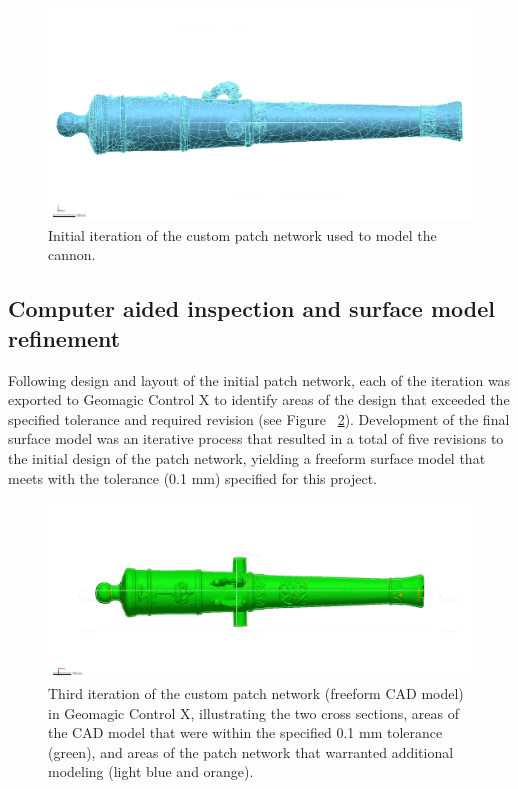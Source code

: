 \documentclass[review]{elsarticle}
\begin{document}
\begin{figure}[ht]\centering
\includegraphics[width=\linewidth]{FigLSC3}
\caption{Initial iteration of the custom patch network used to model the cannon.}
\label{fig:FigPatch}
\end{figure}

\subsection*{Computer aided inspection and surface model refinement}

Following design and layout of the initial patch network, each of the iteration was exported to Geomagic Control X to identify areas of the design that exceeded the specified tolerance and required revision (see Figure ~\ref{fig:Fig4}). Development of the final surface model was an iterative process that resulted in a total of five revisions to the initial design of the patch network, yielding a freeform surface model that meets with the tolerance (0.1 mm) specified for this project. 

\begin{figure}[ht]\centering
\includegraphics[width=\linewidth]{FigCanDev}
\caption{Third iteration of the custom patch network (freeform CAD model) in Geomagic Control X, illustrating the two cross sections, areas of the CAD model that were within the specified 0.1 mm tolerance (green), and areas of the patch network that warranted additional modeling (light blue and orange).}
\label{fig:Fig4}
\end{figure}
\end{document}
